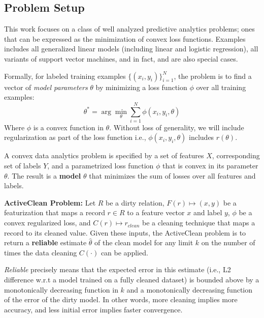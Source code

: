 \subsection{Problem Setup}
This work focuses on a class of well analyzed predictive analytics problems; ones that can be expressed as the minimization of convex loss functions.
Examples includes all generalized linear models (including linear and logistic regression), all variants of support vector machines, and in fact, \avgfunc and \medfunc are also special cases. 

Formally, for labeled training examples $\{(x_{i},y_{i})\}_{i=1}^{N}$, the problem is to find a vector of \emph{model parameters} $\theta$ by minimizing a loss function $\phi$ over all training examples:
\[
 \theta^{*}=\arg\min_{\theta}\sum_{i=1}^{N}\phi(x_{i},y_{i},\theta)
\]
Where $\phi$ is a convex function in $\theta$.
Without loss of generality, we will include regularization as part of the loss function i.e., $\phi(x_{i},y_{i},\theta)$ includes $r(\theta)$.

\begin{definition}
A convex data analytics problem is specified by a set of features $X$, corresponding set of labels $Y$, and a parametrized loss function $\phi$ that is convex in its parameter $\theta$.
The result is a \textbf{model} $\theta$ that minimizes the sum of losses over all features and labels.
\end{definition}

\vspace{0.5em}
\noindent\textbf{ActiveClean Problem: }\label{activeclean}\sloppy
Let $R$ be a dirty relation, $F(r) \mapsto (x,y)$ be a featurization that maps
a record $r \in R$ to a feature vector $x$ and label $y$, $\phi$ be a convex regularized loss,
and $C(r) \mapsto r_{clean}$ be a cleaning technique that maps a record to its cleaned value. 
Given these inputs, the ActiveClean problem is to return a \textbf{reliable} estimate $\hat{\theta}$ of the clean model for any limit $k$ on the number of times the data cleaning $C(\cdot)$ can be applied.

\vspace{0.25em}

\emph{Reliable} precisely means that the expected error in this estimate (i.e., L2 difference w.r.t a model trained on a fully cleaned dataset) is bounded above by a monotonically decreasing function in $k$ and a monotonically decreasing function of the error of the dirty model. In other words, more cleaning implies more accuracy, and less initial error implies faster convergence.

